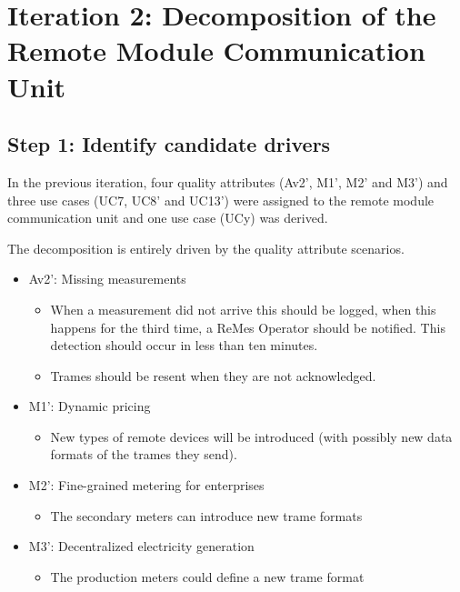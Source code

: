 \section{Iteration 2: Decomposition of the Remote Module Communication Unit}
\label{add:it2}

\subsection{Step 1: Identify candidate drivers}
\label{add:it2/drivers}

\npar In the previous iteration, four quality attributes (Av2', M1', M2' and
M3') and three use cases (UC7, UC8' and UC13') were assigned to the remote
module communication unit and one use case (UCy) was derived. 

\npar The decomposition is entirely driven by the quality attribute scenarios. 

\begin{itemize}
  	\item Av2': Missing measurements
  	\begin{itemize}
    	\item When a measurement did not arrive this should be logged, when
  		this happens for the third time, a ReMes Operator should be notified. This
  		detection should occur in less than ten minutes.
		\item Trames should be resent when they are not acknowledged.
  	\end{itemize}
  	\item M1': Dynamic pricing
  	\begin{itemize}
    	\item New types of remote devices will be introduced (with possibly new
    	data formats of the trames they send).
  	\end{itemize}
  	\item M2': Fine-grained metering for enterprises
  	\begin{itemize}
    	\item The secondary meters can introduce new trame formats
  	\end{itemize}
  	\item M3': Decentralized electricity generation
  	\begin{itemize}
   		\item The production meters could define a new trame format
  	\end{itemize}
\end{itemize}


